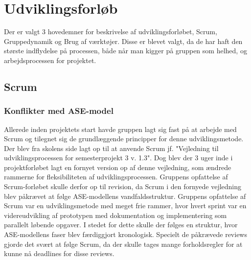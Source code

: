 \section{Udviklingsforløb}
Der er valgt 3 hovedemner for beskrivelse af udviklingsforløbet, Scrum, Gruppedynamik og Brug af værktøjer. Disse er blevet valgt, da de har haft den største indflydelse på processen, både når man kigger på gruppen som helhed, og arbejdsprocessen for projektet.  

\subsection{Scrum}
\subsubsection{Konflikter med ASE-model}
Allerede inden projektets start havde gruppen lagt sig fast på at arbejde med Scrum og tilegnet sig de grundlæggende principper for denne udviklingsmetode. Der blev fra skolens side lagt op til at anvende Scrum jf. "Vejledning til udviklingsprocessen for semesterprojekt 3 v. 1.3". Dog blev der 3 uger inde i projektforløbet lagt en fornyet version op af denne vejledning, som ændrede rammerne for fleksibiliteten af udviklingsprocessen. Gruppens opfattelse af Scrum-forløbet skulle derfor op til revision, da Scrum i den fornyede vejledning blev påkrævet at følge ASE-modellens vandfaldsstruktur. Gruppens opfattelse af Scrum var en udviklingsmetode med meget frie rammer, hvor hvert sprint var en videreudvikling af prototypen med dokumentation og implementering som 
parallelt løbende opgaver. I stedet for dette skulle der følges en struktur, hvor ASE-modellens faser blev færdiggjort kronologisk. Specielt de påkrævede reviews gjorde det svært at følge Scrum, da der skulle tages mange forholdsregler for at kunne nå deadlines for disse reviews.
 
